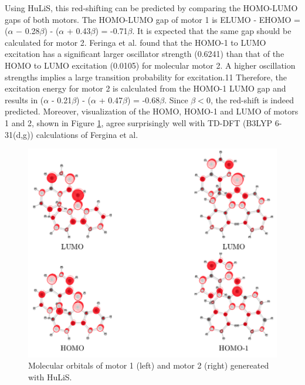 \documentclass{article}
\begin{document}
Using HuLiS, this red-shifting can be predicted by comparing the HOMO-LUMO gaps of both motors. The HOMO-LUMO gap of motor 1 is ELUMO - EHOMO = ($\alpha$ − 0.28$\beta$) - ($\alpha$ + 0.43$\beta$) = -0.71$\beta$. It is expected that the same gap should be calculated for motor 2. Feringa et al. found that the HOMO-1 to LUMO excitation has a significant larger oscillator strength (0.6241) than that of the HOMO to LUMO excitation (0.0105) for molecular motor 2. A higher oscillation strengths implies a large transition probability for excitation.11 Therefore, the excitation energy for motor 2 is calculated from the HOMO-1 LUMO gap and results in ($\alpha$ - 0.21$\beta$) - ($\alpha$ + 0.47$\beta$) = -0.68$\beta$. Since $\beta {<} 0$, the red-shift is indeed predicted. Moreover, visualization of the HOMO, HOMO-1 and LUMO of motors 1 and 2, shown in Figure \ref{fig:hulis_orbitals}, agree surprisingly well with TD-DFT (B3LYP 6-31(d,g)) calculations of Fergina et al.

\begin{figure}[h]
\centering
\includegraphics[scale=0.75]{./images/hulis_mm.png}
\caption{Molecular orbitals of motor 1 (left) and motor 2 (right) genereated with HuLiS.}
\label{fig:hulis_orbitals}
\end{figure} 

               
    
\end{document}
